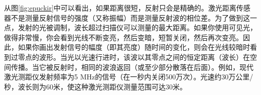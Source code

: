 
从图\ref{fig:epuckir}中可以看出，如果距离很短，反射只会是精确的。激光距离传感器不是测量反射信号的强度（又称振幅）而是测量反射波的相位差。为了做到这一点，发射的光被调制，波长超过扫描仪可以测量的最大距离。如果你使用可见光，做得非常慢，你会看到光线不断变亮，然后变暗，短暂关闭，然后再次变亮。因此，如果你画出发射信号的幅度（即其亮度）随时间的变化，则会在光线较暗时看到过零点的波形。当光以光速行进时，该波以其零点之间的恒定距离（波长）在空间传播。当它被反射时，相同的波浪返回（或至少部分散落在后面）。例如，现代激光测距仪发射频率为5 MHz的信号（在一秒内关闭500万次）。光速约30万公里/秒，波长则为60米，使这种激光测距仪测量范围可达30米。


